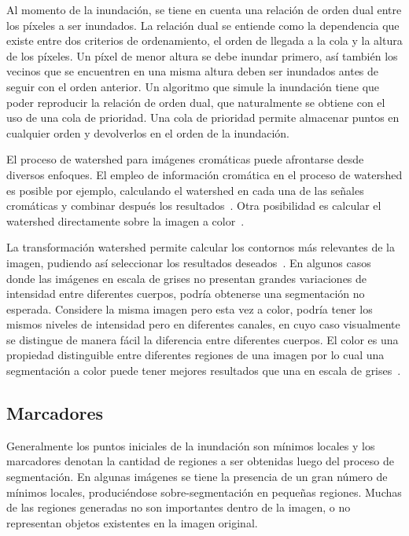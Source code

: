 Al momento de la inundación, se tiene en cuenta una relación de orden dual entre los píxeles a ser inundados. La relación dual se entiende como la dependencia que existe entre dos criterios de ordenamiento, el orden de llegada a la cola y la altura de los píxeles. Un píxel de menor altura se debe inundar primero, así también los vecinos que se encuentren en una misma altura deben ser inundados antes de seguir con el orden anterior. Un algoritmo que simule la inundación tiene que poder reproducir la relación de orden dual, que naturalmente se obtiene con el uso de una cola de prioridad. Una cola de prioridad permite almacenar puntos en cualquier orden y devolverlos en el orden de la inundación.

El proceso de watershed para imágenes cromáticas puede afrontarse desde diversos enfoques. El empleo de información cromática en el proceso de watershed es posible por ejemplo, calculando el watershed en cada una de las señales cromáticas y combinar después los resultados~\cite{Saarinen}. Otra posibilidad es calcular el watershed directamente sobre la imagen a color~\cite{Meyer}.

La transformación watershed permite calcular los contornos más relevantes de la imagen, pudiendo así seleccionar los resultados deseados~\cite{Meyer}. En algunos casos donde las imágenes en escala de grises no presentan grandes variaciones de intensidad entre diferentes cuerpos, podría obtenerse una segmentación no esperada. Considere la misma imagen pero esta vez a color, podría tener los mismos niveles de intensidad pero en diferentes canales, en cuyo caso visualmente se distingue de manera fácil la diferencia entre diferentes cuerpos. El color es una propiedad distinguible entre diferentes regiones de una imagen por lo cual una segmentación a color puede tener mejores resultados que una en escala de grises~\cite{Lezoray}.

\subsection{Marcadores}
Generalmente los puntos iniciales de la inundación son mínimos locales y los marcadores denotan la cantidad de regiones a ser obtenidas luego del proceso de segmentación. En algunas imágenes se tiene la presencia de un gran número de mínimos locales, produciéndose sobre-segmentación en pequeñas regiones. Muchas de las regiones generadas no son importantes dentro de la imagen, o no representan objetos existentes en la imagen original.

